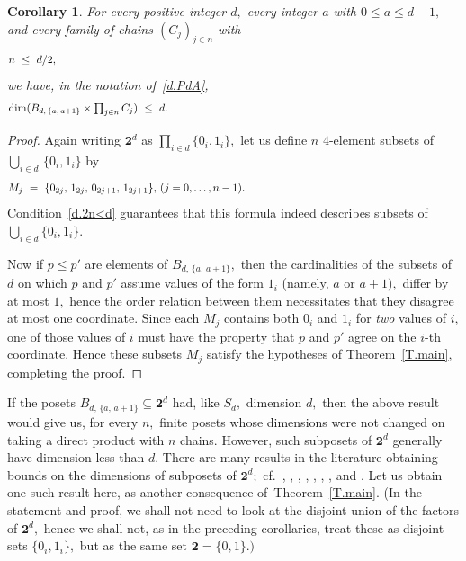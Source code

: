 \documentclass{amsart}
\newtheorem{corollary}[theorem]{Corollary}
\numberwithin{equation}{section}
\numberwithin{theorem}{section}
\newcommand{\2}{\mathbf{2}}
\begin{document}
\begin{corollary}\label{C.Pa,a+1}
For every positive integer $d,$ every integer $a$ with
$0\leq a\leq d-1,$ and every family of chains $(C_j)_{j\in n}$ with
%
\begin{equation}\begin{minipage}[c]{35pc}\label{d.2n<d}
$n\ \leq\ d/2,$
\end{minipage}\end{equation}
%
we have, in the notation of~\eqref{d.PdA},
%
\begin{equation}\begin{minipage}[c]{35pc}\label{d.dimPdaa+1}
$\dim(B_{d,\,\{a,\,a+1\}}\times\prod_{j\in n} C_j)\ \leq\ d.$
\end{minipage}\end{equation}
%
\end{corollary}

\begin{proof}
Again writing $\2^d$ as $\prod_{i\in d}\{0_i,1_i\},$ let us define
$n$ $\!4\!$-element subsets of $\bigcup_{i\in d}\,\{0_i,1_i\}$ by
%
\begin{equation}\begin{minipage}[c]{35pc}\label{d.M_j}
$M_j\ =\ \{0_{2j},\,1_{2j},\,0_{2j+1},\,1_{2j+1}\},$ $(j=0,\dots,n-1).$
\end{minipage}\end{equation}
%
Condition~\eqref{d.2n<d} guarantees that this formula indeed
describes subsets of $\bigcup_{i\in d}\{0_i,1_i\}.$

Now if $p\leq p'$ are elements of $B_{d,\,\{a,\,a+1\}},$ then the
cardinalities of the subsets of $d$ on which $p$ and $p'$ assume
values of the form $1_i$ (namely, $a$ or $a+1),$
differ by at most $1,$ hence the order relation between
them necessitates that they disagree at most one coordinate.
Since each $M_j$ contains both $0_i$ and $1_i$ for
{\em two} values of $i,$ one of those values of $i$ must have
the property that $p$ and $p'$ agree on the $\!i\!$-th coordinate.
Hence these subsets $M_j$ satisfy the hypotheses
of Theorem~\ref{T.main}, completing the proof.
\end{proof}

If the posets $B_{d,\,\{a,\,a+1\}}\subseteq \2^d$ had, like
$S_d,$ dimension $d,$ then the above result would give us,
for every $n,$ finite posets whose dimensions were not changed on
taking a direct product with $n$ chains.
However, such subposets of $\2^d$ generally have dimension less
than $d.$
There are many results in the literature obtaining
bounds on the dimensions of subposets of $\2^d;$
cf.~\cite{BD}, \cite{F+T+W}, \cite{ZF}, \cite{H+K+T},
\cite[Theorem~7.1]{K+T}, \cite{Ko+Ta},
\cite[Theorems~7, 10, 12 and 13]{lin}, and \cite[Theorem~2]{Trotter89}.
Let us obtain one such result here, as another consequence
of~Theorem~\ref{T.main}.
(In the statement and proof, we shall not need to look
at the disjoint union of the factors of
$\2^d,$ hence we shall not, as in the preceding
corollaries, treat these as disjoint sets $\{0_i,1_i\},$
but as the same set $\2=\{0,1\}.)$
\end{document}
